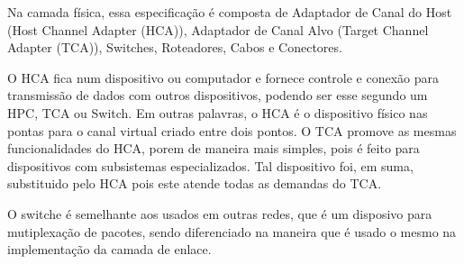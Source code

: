 \documentclass[a4paper,12pt]{article}
\begin{document}
Na camada física, essa especificação é composta de Adaptador de Canal do Host (Host Channel Adapter (HCA)), Adaptador de Canal Alvo (Target Channel Adapter (TCA)), Switches, Roteadores, Cabos e Conectores.

O HCA fica num dispositivo ou computador e fornece controle e conexão para transmissão de dados com outros dispositivos, podendo ser esse segundo um HPC, TCA ou Switch. Em outras palavras, o HCA é o dispositivo físico nas pontas para o canal virtual criado entre dois pontos. O TCA promove as mesmas funcionalidades do HCA, porem de maneira mais simples, pois é feito para dispositivos com subsistemas especializados. Tal dispositivo foi, em suma, substituido pelo HCA pois este atende todas as demandas do TCA.

O switche é semelhante aos usados em outras redes, que é um disposivo para mutiplexação de pacotes, sendo diferenciado na maneira que é usado o mesmo na implementação da camada de enlace.
\end{document}
